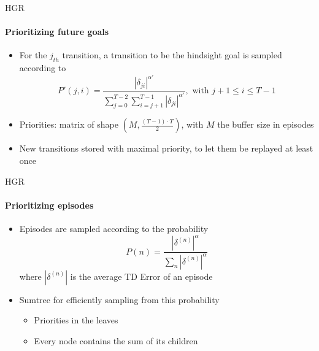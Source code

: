 \documentclass{beamer}
\begin{document}
      \begin{frame}[fragile]{HGR}
            \framesubtitle{Prioritizing future goals}
            \begin{itemize}
                  \item For the $j_{th}$ transition, a transition to be the hindsight goal is sampled according to
                  \begin{equation}
                        P'(j,i) = \frac{|\delta_{ji}|^{\alpha'}}{\sum_{j=0}^{T-2} \sum_{i=j+1}^{T-1}|\delta_{ji}|^{\alpha'}} , \text{ with } j+1 \leq i \leq T-1
                  \end{equation}
                  \item Priorities: matrix of shape $\left(M, \frac{(T-1)\cdot T}{2}\right)$, with $M$ the buffer size in episodes

                  \item New transitions stored with maximal priority, to let them be replayed at least once
            \end{itemize}
      \end{frame}

      \begin{frame}[fragile]{HGR}
            \framesubtitle{Prioritizing episodes}
            \begin{itemize}
                  \item Episodes are sampled according to the probability
                  \begin{equation}
                        P(n) = \frac{|\delta^{(n)}|^{\alpha}}{\sum_{n}|\delta^{(n)}|^{\alpha}}
                  \end{equation} where $|\delta^{(n)}|$ is the average TD Error of an episode
                  \item Sumtree for efficiently sampling from this probability
                  \begin{itemize}
                        \item Priorities in the leaves
                        \item Every node contains the sum of its children
                  \end{itemize}
            \end{itemize}
      \end{frame}
\end{document}
